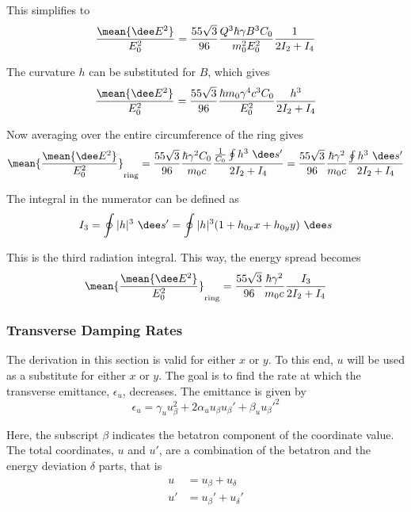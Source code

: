 This simplifies to
\begin{equation}
    \frac{\mean{\dee E^2}}{E_0^2} = \frac{55 \sqrt{3}}{96} \frac{Q^3 \hbar \gamma B^3 C_0}{m_0^2 E_0^2} \frac{1}{2I_2 + I_4}
\end{equation}

The curvature $h$ can be substituted for $B$, which gives
\begin{equation}
    \frac{\mean{\dee E^2}}{E_0^2} = \frac{55 \sqrt{3}}{96}
    \frac{\hbar m_0 \gamma^4 c^3 C_0}{E_0^2} \frac{h^3}{2I_2 + I_4}
    \label{eq:meanenergydeviation}
\end{equation}

Now averaging over the entire circumference of the ring gives
\begin{equation}
    \mean{\frac{\mean{\dee E^2}}{E_0^2}}_\text{ring} = \frac{55 \sqrt{3}}{96} \frac{\hbar \gamma^2 C_0}{m_0 c} \frac{\frac{1}{C_0}\oint h^3 \ \dee s'}{2I_2 + I_4} = \frac{55 \sqrt{3}}{96} \frac{\hbar \gamma^2}{m_0 c} \frac{\oint h^3 \ \dee s'}{2I_2 + I_4}
\end{equation}

The integral in the numerator can be defined as
\begin{equation}
    I_3 = \oint |h|^3 \ \dee s' = \oint |h|^3 (1 + h_{0x} x + h_{0y}y) \ \dee s
\end{equation}

This is the third radiation integral. This way, the energy spread becomes
\begin{equation}
\mean{\frac{\mean{\dee E^2}}{E_0^2}}_\text{ring} = \frac{55 \sqrt{3}}{96} \frac{\hbar \gamma^2}{m_0 c} \frac{I_3}{2I_2 + I_4}
\end{equation}

\subsubsection{Transverse Damping Rates}
\label{sec:transversedamping}

The derivation in this section is valid for either $x$ or $y$. To this end, $u$ will be used as a substitute for either $x$ or $y$. The goal is to find the rate at which the transverse emittance, $\epsilon_u$, decreases. The emittance is given by
\begin{equation}
    \epsilon_u = \gamma_u u_\beta^2 + 2 \alpha_u u_\beta u_\beta' + \beta_u u_\beta'^2
    \label{eq:emittanceu}
\end{equation}

Here, the subscript $\beta$ indicates the betatron component of the coordinate value. The total coordinates, $u$ and $u'$, are a combination of the betatron and the energy deviation $\delta$ parts, that is
\begin{align}
    u  &= u_\beta  + u_\delta\\
    u' &= u_\beta' + u_\delta'
\end{align}

